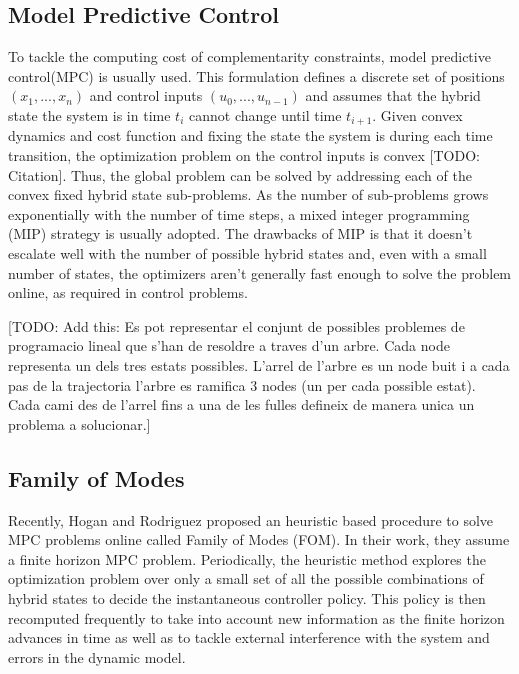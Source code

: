 \documentclass[12,twoside]{TFG-GM}
\theoremstyle{definition}
\theoremstyle{remark}
\begin{document}
\subsection{Model Predictive Control}
\label{subsec:MPC}
To tackle the computing cost of complementarity constraints, model predictive control(MPC) is usually used. This formulation defines a discrete set of positions $(x_1, ..., x_n)$ and control inputs $(u_0, ..., u_{n-1})$ and assumes that the hybrid state the system is in time $t_i$ cannot change until time $t_{i+1}$. Given convex dynamics and cost function and fixing the state the system is during each time transition, the optimization problem on the control inputs is convex [TODO: Citation]. Thus, the global problem can be solved by addressing each of the convex fixed hybrid state sub-problems.
As the number of sub-problems grows exponentially with the number of time steps, a mixed integer programming (MIP) strategy is usually adopted. The drawbacks of MIP is that it doesn't escalate well with the number of possible hybrid states and, even with a small number of states, the optimizers aren't generally fast enough to solve the problem online, as required in control problems.

[TODO: Add this: Es pot representar el conjunt de possibles problemes de programacio lineal que s'han de resoldre a traves d'un arbre. Cada node representa un dels tres estats possibles. L'arrel de l'arbre es un node buit i a cada pas de la trajectoria l'arbre es ramifica 3 nodes (un per cada possible estat). Cada cami des de l'arrel fins a una de les fulles defineix de manera unica un problema a solucionar.]

\subsection{Family of Modes}
\label{subsec:FOM}
Recently, Hogan and Rodriguez \cite{fom} proposed an heuristic based procedure to solve MPC problems online called Family of Modes (FOM). In their work, they assume a finite horizon MPC problem. Periodically, the heuristic method explores the optimization problem over only a small set of all the possible combinations of hybrid states to decide the instantaneous controller policy. This policy is then recomputed frequently to take into account new information as the finite horizon advances in time as well as to tackle external interference with the system and errors in the dynamic model.
\end{document}
